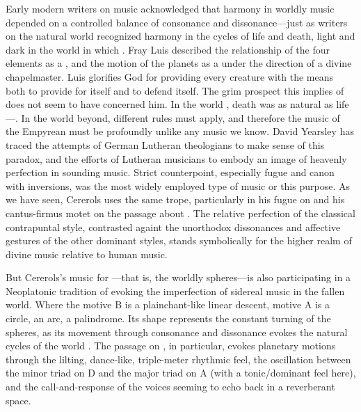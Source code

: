 Early modern writers on music acknowledged that harmony in worldly music
depended on a controlled balance of consonance and dissonance---just as writers
on the natural world recognized harmony in the cycles of life and death, light
and dark in the world in which .%
Fray Luis described the relationship of the four elements as a , and the motion of the planets as a  under the
direction of a divine chapelmaster.%
    \citXXX[Luis]
Luis glorifies God for providing every creature with the means both to provide
for itself and to defend itself. 
The grim prospect this implies of  does
not seem to have concerned him.%
    \citXXX[Kipling]
In the world , death was as natural as life---.%
    \citXXX[Job]
In the world beyond, different rules must apply, and therefore the music of the
Empyrean must be profoundly unlike any music we know.
David Yearsley has traced the attempts of German Lutheran theologians to make
sense of this paradox, and the efforts of Lutheran musicians to embody an image
of heavenly perfection in sounding music.
Strict counterpoint, especially fugue and canon with inversions, was the most
widely employed type of music or this purpose.
As we have seen, Cererols uses the same trope, particularly in his fugue on
 and his cantus-firmus motet on the passage about
.
The relative perfection of the classical contrapuntal style, contrasted againt
the unorthodox dissonances and affective gestures of the other dominant styles,
stands symbolically for the higher realm of divine music relative to human
music.

But Cererols's music for ---that is, the worldly
spheres---is also participating in a Neoplatonic tradition of evoking the
imperfection of sidereal music in the fallen world.
Where the  motive B is a plainchant-like linear descent, motive A
is a circle, an arc, a palindrome.
Its shape represents the constant turning of the spheres, as its movement
through consonance and dissonance evokes the natural cycles of the world
.
The passage on , in particular, evokes
planetary motions through the lilting, dance-like, triple-meter rhythmic feel,
the oscillation between the minor triad on D and the major triad on A (with a
tonic/dominant feel here), and the call-and-response of the voices seeming to
echo back in a reverberant space.


